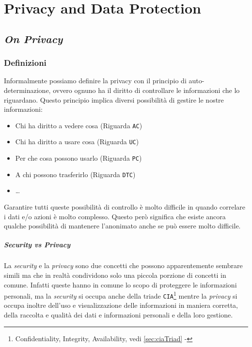 \chapter{Privacy and Data Protection}
\thispagestyle{chapterInit}

\section{\textit{On Privacy}}
    \subsection{Definizioni}
        Informalmente possiamo definire la privacy con il principio di auto-determinazione, ovvero ognuno ha il diritto di controllare le informazioni che lo riguardano.\newline
        Questo principio implica diversi possibilità di gestire le nostre informazioni:
        \begin{itemize}
            \item Chi ha diritto a vedere cosa (Riguarda \texttt{AC})
            \item Chi ha diritto a usare cosa (Riguarda \texttt{UC})
            \item Per che cosa possono usarlo (Riguarda \texttt{PC})
            \item A chi possono trasferirlo (Riguarda \texttt{DTC})
            \item \dots
        \end{itemize}
        Garantire tutti queste possibilità di controllo è molto difficile in quando correlare i dati e/o azioni è molto complesso. Questo però significa che esiste ancora qualche possibilità di mantenere l'anonimato anche se può essere molto difficile.
        \paragraph{\textit{Security} vs \textit{Privacy}}
        La \textit{security} e la \textit{privacy} sono due concetti che possono apparentemente sembrare simili ma che in realtà condividono solo una piccola porzione di concetti in comune. Infatti queste hanno in comune lo scopo di proteggere le informazioni personali, ma la \textit{security} si occupa anche della triade \texttt{CIA}\footnote{Confidentiality, Integrity, Availability, vedi \ref{sec:ciaTriad} - } mentre la \textit{privacy} si occupa inoltre dell'uso e visualizzazione delle informazioni in maniera corretta, della raccolta e qualità dei dati e informazioni personali e della loro gestione.
